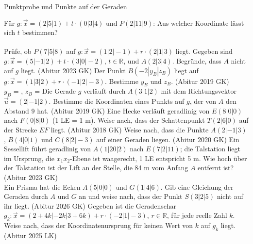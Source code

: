 \setcounter{aufgabe}{12}

\begin{aufgabe}{Punktprobe und Punkte auf der Geraden}
\begin{teile}
\teil Für $g\colon \vec x = (2 | 5 | 1) + t \cdot (0 | 3 | 4)$ und $P(2 | 11 | 9)$: Aus welcher Koordinate lässt sich $t$ bestimmen?  \\  \\ 
\teil Prüfe, ob $P(7 | 5 | 8)$ auf $g\colon \vec x = (1 | 2 | -1) + r \cdot (2 | 1 | 3)$ liegt.
\teil Gegeben sind $g\colon \vec x = (5 | -1 | 2) + t \cdot (3 | 0 | -2)$, $t \in \mathbb{R}$, und $A(2 | 3 | 4)$. Begründe, dass $A$ nicht auf $g$ liegt. \hfill (Abitur 2023 GK)
\teil Der Punkt $B(-2 | y_B | z_B)$ liegt auf $g\colon \vec x = (1 | 3 | 2) + r \cdot (-1 | 2 | -3)$. Bestimme $y_B$ und $z_B$. \hfill (Abitur 2019 GK) \\ $y_B$ = \leerfeld , $z_B$ = \leerfeld
\teil Die Gerade $g$ verläuft durch $A(3 | 1 | 2)$ mit dem Richtungsvektor $\vec u = (2 | -1 | 2)$. Bestimme die Koordinaten eines Punkts auf $g$, der von $A$ den Abstand 9 hat. \hfill (Abitur 2019 GK)
\teil Eine Hecke verläuft geradlinig von $E(8 | 0 | 0)$ nach $F(0 | 8 | 0)$ (1 LE = 1 m). Weise nach, dass der Schattenpunkt $T(2 | 6 | 0)$ auf der Strecke $EF$ liegt. \hfill (Abitur 2018 GK)
\teil Weise nach, dass die Punkte $A(2 | -1 | 3)$, $B(4 | 0 | 1)$ und $C(8 | 2 | -3)$ auf einer Geraden liegen. \hfill (Abitur 2020 GK)
\teil Ein Sessellift führt geradlinig von $A(1 | 20 | 2)$ nach $E(7 | 2 | 11)$; die Talstation liegt im Ursprung, die $x_1x_2$-Ebene ist waagerecht, 1 LE entspricht 5 m. Wie hoch über der Talstation ist der Lift an der Stelle, die 84 m vom Anfang $A$ entfernt ist? \hfill (Abitur 2023 GK) \\ \leerfeld[m]
\teil Ein Prisma hat die Ecken $A(5 | 0 | 0)$ und $G(1 | 4 | 6)$. Gib eine Gleichung der Geraden durch $A$ und $G$ an und weise nach, dass der Punkt $S(3 | 2 | 5)$ nicht auf ihr liegt. \hfill (Abitur 2026 GK)
\teil Gegeben ist die Geradenschar $g_k\colon \vec x = (2 + 4k | -2k | 3 + 6k) + r \cdot (-2 | 1 | -3)$, $r \in \mathbb{R}$, für jede reelle Zahl $k$. Weise nach, dass der Koordinatenursprung für keinen Wert von $k$ auf $g_k$ liegt. \hfill (Abitur 2025 LK)
\end{teile}
\end{aufgabe}

